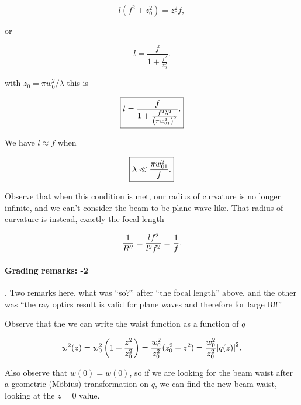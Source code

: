 {\begin{dmath}\label{eqn:problemSet4Problem1:420}
l ( f^2 + z_0^2 ) = z_0^2 f,
\end{dmath}

or

\begin{dmath}\label{eqn:problemSet4Problem1:440}
l
= \frac{f}{1 + \frac{f^2}{z_0^2} }.
\end{dmath}

with $z_0 = \pi w_0^2/\lambda$ this is

\begin{dmath}\label{eqn:problemSet4Problem1:460}
\myBoxed{
l
= \frac{f}{1 + \frac{f^2 \lambda^2}{\left(\pi w_{01}^2\right)^2} }.
}
\end{dmath}

We have $l \approx f$ when

\begin{dmath}\label{eqn:problemSet4Problem1:480}
\myBoxed{
\lambda \ll \frac{\pi w_{01}^2}{f}.
}
\end{dmath}

Observe that when this condition is met, our radius of curvature is no longer infinite, and we can't consider the beam to be plane wave like.  That radius of curvature is instead, exactly the focal length

\begin{dmath}\label{eqn:problemSet4Problem1:500}
\inv{R''} = \frac{l f^2}{ l^2 f^2} = \inv{f}.
\end{dmath}

\paragraph{Grading remarks: -2}.  Two remarks here, what was ``so?'' after ``the focal length'' above, and the other was ``the ray optics result is valid for plane waves and therefore for large R!!''


Observe that the we can write the waist function as a function of $q$

\begin{dmath}\label{eqn:problemSet4Problem1:20}
w^2(z)
= w_0^2 \left( 1 + \frac{z^2}{z_0^2} \right)
= \frac{w_0^2}{z_0^2} ( z_0^2 + z^2 )
= \frac{w_0^2}{z_0^2} \Abs{ q(z) }^2.
\end{dmath}

Also observe that $w(0) = w(0)$, so if we are looking for the beam waist after a geometric (M\"obius) transformation on $q$, we can find the new beam waist, looking at the $z = 0$ value.

}
